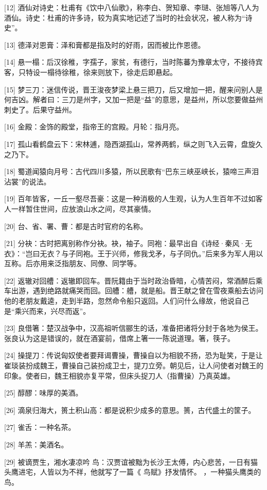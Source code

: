 \documentclass[12pt,UTF8]{ctexbook}
\begin{document}
[12] 酒仙对诗史：杜甫有《饮中八仙歌》，称李白、贺知章、李琎、张旭等八人为酒仙。诗史：杜甫的许多诗，较为真实地记述了当时的社会状况，被人称为“诗史”。

[13] 德泽对恩膏：泽和膏都是指及时的好雨，因而被比作恩德。

[14] 悬一榻：后汉徐稚，字孺子，家贫，有德行，当时陈蕃为豫章太守，不接待宾客，只特设一榻待徐稚，徐来则放下，徐走后即悬起。

[15] 梦三刀：迷信传说，晋王浚夜梦梁上悬三把刀，后又增加一把，醒来问别人是何吉凶。解者曰：三刀是州字，又加一把是“益”的意思，是益州，所以您要做益州刺史了。后果守益州。

[16] 金殿：金饰的殿堂，指帝王的宫殿。月轮：指月亮。

[17] 孤山看鹤盘云下：宋林逋，隐西湖孤山，常养两鹤，纵之则飞入云霄，盘旋久之乃下。

[18] 蜀道闻猿向月号：古代四川多猿，所以民歌有“巴东三峡巫峡长，猿啼三声泪沾裳”的说法。

[19] 百年皆客，一丘一壑尽吾豪：这是一种消极的人生观，认为人生百年不过如客人一样暂住世间，应放浪山水之间，尽其豪情。

[20] 台、省、署、曹：都是古时官府的名称。

[21] 分袂：古时把离别称作分袂。袂，袖子。同袍：最早出自《诗经·秦风·无衣》：“岂曰无衣？与子同袍。王于兴师，修我戈矛，与子同仇。”后来多为军人用以互称。后亦用来泛指朋友、同僚、同学等。

[22] 返辙对回艚：返辙即回车。晋阮籍由于当时政治昏暗，心情苦闷，常酒醉后乘车出游，遇到绝路就痛哭而回。回艚：艚，就是船。晋王献之曾在雪夜乘船去访问他的老朋友戴逵，走到半路，忽然命令船只返回。人们问什么缘故，他说自己是“乘兴而来，兴尽而返”。

[23] 良借箸：楚汉战争中，汉高祖听信郦生的话，准备把诸将分封于各地为侯王。张良认为这是错误的，就在酒宴前，借席上箸一一陈说道理。箸，筷子。

[24] 操提刀：传说匈奴使者要拜谒曹操，曹操自以为相貌不扬，恐为耻笑，于是让崔琰装扮成魏王，曹操自己装扮成卫士，提刀立旁。朝见后，让人问使者对魏王的印象。使者曰，魏王相貌亦复平常，但床头捉刀人（指曹操）乃真英雄。

[25] 醇醪：味厚的美酒。

[26] 滴泉归海大，篑土积山高：都是说积少成多的意思。篑，古代盛土的筐子。

[27] 雀舌：一种名茶。

[28] 羊羔：美酒名。

[29] 被谪贾生，湘水凄凉吟 鸟：汉贾谊被黜为长沙王太傅，内心悲苦，一日有猫头鹰进宅，人皆以为不祥，他就写了一篇《 鸟赋》抒发情怀。 ，一种猫头鹰类的鸟。
\end{document}
